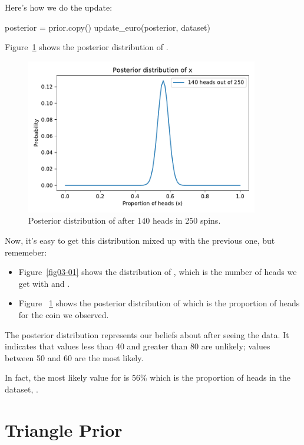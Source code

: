 \documentclass[12pt]{book}
\theoremstyle{exercise}
\begin{document}
Here's how we do the update:

\begin{code}
posterior = prior.copy()
update_euro(posterior, dataset)
\end{code}

Figure~\ref{fig03-02} shows the posterior distribution of .

\begin{figure}
\centerline{\includegraphics[width=4in]{figs/fig03-02.pdf}}
\caption{Posterior distribution of  after 140 heads in 250 spins.}
\label{fig03-02}
\end{figure}

Now, it's easy to get this distribution mixed up with the previous one, but rememeber:

\begin{itemize}

\item Figure~\ref{fig03-01} shows the distribution of , which is the number of heads we get with  and .

\item Figure ~\ref{fig03-02} shows the posterior distribution of  which is the proportion of heads for the coin we observed. 

\end{itemize}

The posterior distribution represents our beliefs about  after seeing the data.
It indicates that values less than 40 and greater than 80 are unlikely; values between 50 and 60 are the most likely.

In fact, the most likely value for  is 56\% which is the proportion of heads in the dataset, .


\section{Triangle Prior}
\label{triangle}
\end{document}
